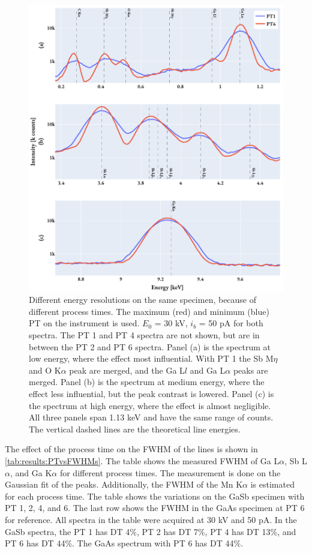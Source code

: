 \begin{figure}[hptb]
    \centering
    \includegraphics[width=0.95\linewidth]{figures/results/eds_energyResolutions_process_time.pdf}
    \caption{
        Different energy resolutions on the same specimen, because of different process times.
        The maximum (red) and minimum (blue) PT on the instrument is used.
        $E_0$ = 30 kV, $i_b$ = 50 pA for both spectra.
        The PT 1 and PT 4 spectra are not shown, but are in between the PT 2 and PT 6 spectra.
        Panel (a) is the spectrum at low energy, where the effect most influential.
        With PT 1 the Sb M$\eta$ and O K$\alpha$ peak are merged, and the Ga L$l$ and Ga L$\alpha$ peaks are merged.
        Panel (b) is the spectrum at medium energy, where the effect less influential, but the peak contrast is lowered.
        Panel (c) is the spectrum at high energy, where the effect is almost negligible.
        All three panels span 1.13 keV and have the same range of counts.
        The vertical dashed lines are the theoretical line energies.
    }
    \label{fig:results:energy_resolutions_process_time}
\end{figure}


The effect of the process time on the FWHM of the lines is shown in \cref{tab:results:PTvsFWHMs}.
The table shows the measured FWHM of Ga L$\alpha$, Sb L$\alpha$, and Ga K$\alpha$ for different process times.
The measurement is done on the Gaussian fit of the peaks.
Additionally, the FWHM of the Mn K$\alpha$ is estimated for each process time.
The table shows the variations on the GaSb specimen with PT 1, 2, 4, and 6.
The last row shows the FWHM in the GaAs specimen at PT 6 for reference.
All spectra in the table were acquired at 30 kV and 50 pA.
In the GaSb spectra, the PT 1 has DT 4\%, PT 2 has DT 7\%, PT 4 has DT 13\%, and PT 6 has DT 44\%.
The GaAs spectrum with PT 6 has DT 44\%.

